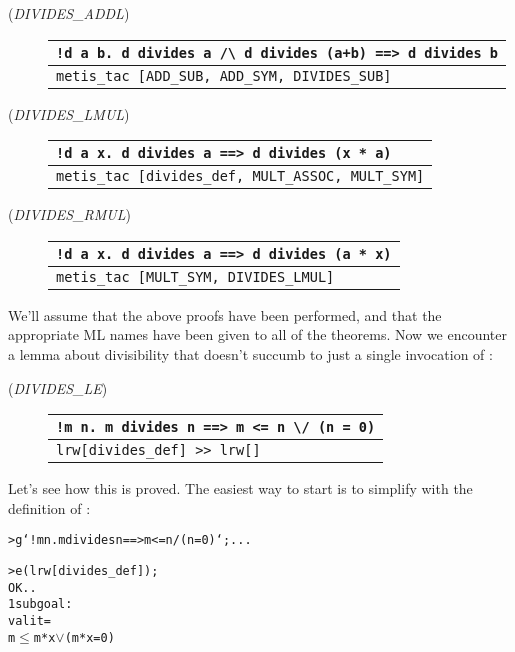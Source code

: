 \begin{description}
\item[\small{({\it DIVIDES\_ADDL\/})}]
\begin{tabular}[t]{l}
\verb|!d a b. d divides a /\ d divides (a+b) ==> d divides b| \\ \hline
 \verb+metis_tac [ADD_SUB, ADD_SYM, DIVIDES_SUB]+ \\
\end{tabular}

\item[\small{({\it DIVIDES\_LMUL\/})}]
\begin{tabular}[t]{l}
\verb+!d a x. d divides a ==> d divides (x * a)+ \\ \hline
 \verb+metis_tac [divides_def, MULT_ASSOC, MULT_SYM]+ \\
\end{tabular}

\item[\small{({\it DIVIDES\_RMUL\/})}]
\begin{tabular}[t]{l}
\verb+!d a x. d divides a ==> d divides (a * x)+ \\ \hline
 \verb+metis_tac [MULT_SYM, DIVIDES_LMUL]+ \\
\end{tabular}

\end{description}

\noindent We'll assume that the above proofs have been performed, and
that the appropriate ML names have been given to all of the theorems.
Now we encounter a lemma about divisibility that doesn't succumb to just a
single invocation of :
\begin{description}
\item [\small{({\it DIVIDES\_LE\/})}]
\begin{tabular}[t]{l}
\verb+!m n. m divides n ==> m <= n \/ (n = 0)+ \\ \hline
\verb+lrw[divides_def] >> lrw[]+ \\
\end{tabular}
\end{description}
Let's see how this is proved.
The easiest way to start is to simplify with the definition of :
\begin{session}
\begin{alltt}
> g `!m n. m divides n ==> m <= n \bs{}/ (n = 0)`;   ...

> e (lrw[divides_def]);
OK..
1 subgoal:
val it =
m \(\le\) m * x \(\lor\) (m * x = 0)
\end{alltt}
\end{session}

